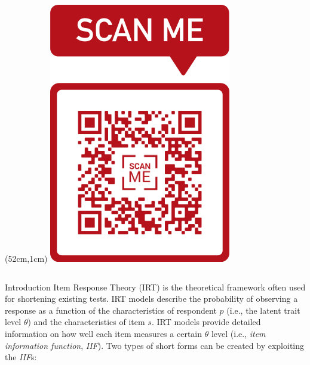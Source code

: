\documentclass[final,t]{beamer}
\begin{document}
\begin{frame}
\begin{center}
		\begin{textblock*}{5cm}(52cm,1cm)
			\includegraphics[width=.90\linewidth]{img/qr.png}\\
		\end{textblock*}
		
		\vspace{3mm}
		
		
		
	\end{center}
	
	
		\begin{columns}[t]
	
			
			\begin{column}{.45\linewidth}
		\begin{block}{\centering Introduction}
	Item Response Theory (IRT) is the theoretical framework often used for shortening existing tests.  IRT models describe the probability of observing a response as a function of the characteristics of respondent $p$ (i.e., the latent trait level $\theta$) and the characteristics of item $s$. IRT models provide detailed information on how well each item measures a certain $\theta$ level (i.e., \emph{item information function}, \emph{IIF}). 
	Two types of short forms can be created by exploiting the \emph{IIF}s: 
	

\end{block}
\end{column}
\end{columns}
\end{frame}
\end{document}
